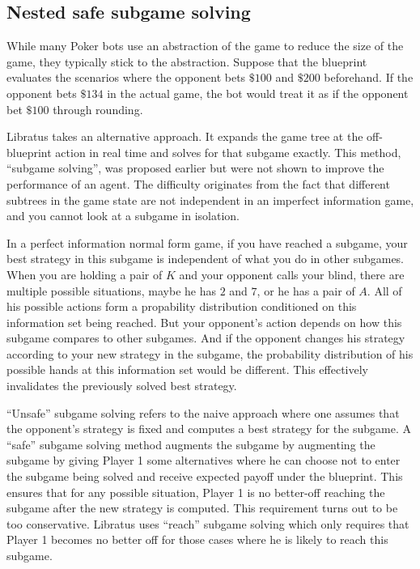 \documentclass[10pt,a4paper]{article}
\begin{document}
\subsection{Nested safe subgame solving}
While many Poker bots use an abstraction of the game to reduce the size of the game, they typically stick to the abstraction. Suppose that the blueprint evaluates the scenarios where the opponent bets $\$100$ and $\$200$ beforehand. If the opponent bets $\$134$ in the actual game, the bot would treat it as if the opponent bet $\$100$ through rounding.

Libratus takes an alternative approach. It expands the game tree at the off-blueprint action in real time and solves for that subgame exactly. This method, ``subgame solving'', was proposed earlier but were not shown to improve the performance of an agent. The difficulty originates from the fact that different subtrees in the game state are not independent in an imperfect information game, and you cannot look at a subgame in isolation.

In a perfect information normal form game, if you have reached a subgame, your best strategy in this subgame is independent of what you do in other subgames. When you are holding a pair of $K$ and your opponent calls your blind, there are multiple possible situations, maybe he has $2$ and $7$, or he has a pair of $A$. All of his possible actions form a propability distribution conditioned on this information set being reached. But your opponent's action depends on how this subgame compares to other subgames. And if the opponent changes his strategy according to your new strategy in the subgame, the probability distribution of his possible hands at this information set would be different. This effectively invalidates the previously solved best strategy.

``Unsafe'' subgame solving refers to the naive approach where one assumes that the opponent's strategy is fixed and computes a best strategy for the subgame. A ``safe'' subgame solving method augments the subgame by augmenting the subgame by giving Player 1 some alternatives where he can choose not to enter the subgame being solved and receive expected payoff under the blueprint. This ensures that for any possible situation, Player 1 is no better-off reaching the subgame after the new strategy is computed. This requirement turns out to be too conservative. Libratus uses ``reach'' subgame solving which only requires that Player 1 becomes no better off for those cases where he is likely to reach this subgame.
\end{document}

